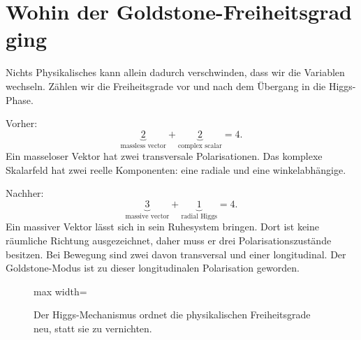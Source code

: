 \section{Wohin der Goldstone-Freiheitsgrad ging}

Nichts Physikalisches kann allein dadurch verschwinden, dass wir die Variablen wechseln. Zählen wir die Freiheitsgrade vor und nach dem Übergang in die Higgs-Phase.

Vorher:
\begin{equation}
  \underbrace{2}_{\text{massless vector}}
  +
  \underbrace{2}_{\text{complex scalar}}
  =4.
\end{equation}
Ein masseloser Vektor hat zwei transversale Polarisationen. Das komplexe Skalarfeld hat zwei reelle Komponenten: eine radiale und eine winkelabhängige.

Nachher:
\begin{equation}
  \underbrace{3}_{\text{massive vector}}
  +
  \underbrace{1}_{\text{radial Higgs}}
  =4.
  \label{eq:l08-degree-count}
\end{equation}
Ein massiver Vektor lässt sich in sein Ruhesystem bringen. Dort ist keine räumliche Richtung ausgezeichnet, daher muss er drei Polarisationszustände besitzen. Bei Bewegung sind zwei davon transversal und einer longitudinal. Der Goldstone-Modus ist zu dieser longitudinalen Polarisation geworden.

\begin{figure}[htbp]
\centering
\begin{adjustbox}{max width=\linewidth}
\end{adjustbox}
\caption{Der Higgs-Mechanismus ordnet die physikalischen Freiheitsgrade neu, statt sie zu vernichten.}
\label{fig:l08-degree-rearrangement}
\end{figure}

